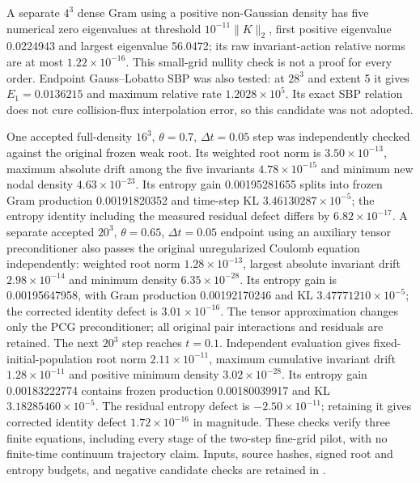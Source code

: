 \documentclass[11pt,letterpaper]{article}
\begin{document}
A separate $4^3$ dense Gram using a positive non-Gaussian density has five
numerical zero eigenvalues at threshold $10^{-11}\|K\|_2$, first positive
eigenvalue 0.0224943 and largest eigenvalue 56.0472; its raw invariant-action
relative norms are at most $1.22\times10^{-16}$. This small-grid nullity check
is not a proof for every order. Endpoint Gauss--Lobatto SBP was also tested:
at $28^3$ and extent 5 it gives $E_1=0.0136215$ and maximum relative rate
$1.2028\times10^5$. Its exact SBP relation does not cure collision-flux
interpolation error, so this candidate was not adopted.

One accepted full-density $16^3$, $\theta=0.7$, $\Delta t=0.05$ step was
independently checked against the original frozen weak root. Its weighted
root norm is $3.50\times10^{-13}$, maximum absolute drift among the five
invariants $4.78\times10^{-15}$ and minimum new nodal density
$4.63\times10^{-23}$. Its entropy gain 0.00195281655 splits into frozen Gram
production 0.00191820352 and time-step KL $3.46130287\times10^{-5}$;
the entropy identity including the measured residual defect differs by
$6.82\times10^{-17}$. A separate accepted $20^3$, $\theta=0.65$, $\Delta t=0.05$ endpoint
using an auxiliary tensor preconditioner also passes the original
unregularized Coulomb equation independently: weighted root norm
$1.28\times10^{-13}$, largest absolute invariant drift
$2.98\times10^{-14}$ and minimum density $6.35\times10^{-28}$. Its
entropy gain is 0.00195647958, with Gram production 0.00192170246 and KL
$3.47771210\times10^{-5}$; the corrected identity defect is
$3.01\times10^{-16}$. The tensor approximation changes only the PCG
preconditioner; all original pair interactions and residuals are retained.
The next $20^3$ step reaches $t=0.1$. Independent evaluation gives
fixed-initial-population root norm $2.11\times10^{-11}$, maximum cumulative
invariant drift $1.28\times10^{-11}$ and positive minimum density
$3.02\times10^{-28}$. Its entropy gain 0.00183222774 contains frozen
production 0.00180039917 and KL $3.18285460\times10^{-5}$. The residual
entropy defect is $-2.50\times10^{-11}$; retaining it gives corrected
identity defect $1.72\times10^{-16}$ in magnitude. These checks verify
three finite equations, including every stage of the two-step fine-grid
pilot, with no finite-time continuum trajectory claim. Inputs, source hashes, signed root
and entropy budgets, and negative candidate checks are retained in
.
\end{document}
